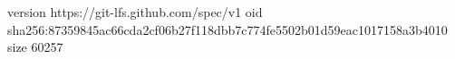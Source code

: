 version https://git-lfs.github.com/spec/v1
oid sha256:87359845ac66cda2cf06b27f118dbb7c774fe5502b01d59eac1017158a3b4010
size 60257
